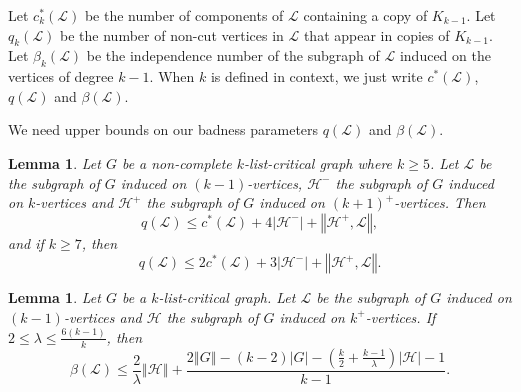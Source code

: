 \documentclass[10pt]{article}
\theoremstyle{plain}
\newtheorem{lem}[thm]{Lemma}
\theoremstyle{definition}
\theoremstyle{remark}
\newcommand{\fancy}[1]{\mathcal{#1}}
\renewcommand{\L}{\fancy{L}}
\newcommand{\HH}{\fancy{H}}
\newcommand{\card}[1]{\left|#1\right|}
\newcommand{\size}[1]{\left\Vert#1\right\Vert}
\newcommand{\parens}[1]{\left( #1 \right)}
\begin{document}
Let $c_k^*(\L)$ be the number of components of $\L$ containing a copy of $K_{k-1}$. Let $q_k(\L)$ be the number of non-cut vertices in $\L$ that appear in copies of $K_{k-1}$.  
Let $\beta_k(\L)$ be the independence number of the subgraph of $\L$ induced on the vertices of degree $k-1$.  
When $k$ is defined in context, we just write $c^*(\L)$, $q(\L)$ and $\beta(\L)$.  

We need upper bounds on our badness parameters $q(\L)$ and $\beta(\L)$.

\begin{lem}\label{qLemmaList}
	Let $G$ be a non-complete $k$-list-critical graph where $k \ge 5$.  Let $\L$ be the subgraph of $G$ induced on $(k-1)$-vertices, $\HH^-$ the subgraph of $G$ induced on $k$-vertices
	and $\HH^+$ the subgraph of $G$ induced on $(k+1)^+$-vertices.  Then
	\[q(\L) \le c^*(\L) + 4\card{\HH^-} + \size{\HH^+, \L},\] and if $k \ge 7$, then
	\[q(\L) \le 2c^*(\L) + 3\card{\HH^-} + \size{\HH^+, \L}.\]
\end{lem}

\begin{lem}\label{betaLemmaList}
	Let $G$ be a $k$-list-critical graph.  Let $\L$ be the subgraph of $G$ induced on $(k-1)$-vertices and	$\HH$ the subgraph of $G$ induced on $k^+$-vertices.  
	If $2 \le \lambda \le \frac{6(k-1)}{k}$, then
	\[\beta(\L) \le \frac{2}{\lambda}\size{\HH} + \frac{2\size{G} - (k-2)\card{G} - \parens{\frac{k}{2} + \frac{k-1}{\lambda}}\card{\HH} - 1}{k-1}.\]
\end{lem}
\end{document}
